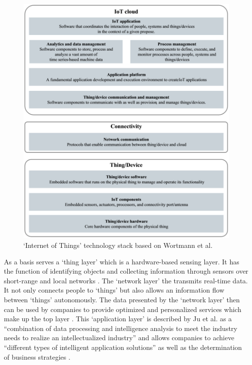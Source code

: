 	\begin{figure}[ht]
	    \begin{center}
	    \includegraphics[scale=0.66]{Talk11/wortmann_stack.png}
	    \end{center}
	    \caption{`Internet of Things' technology stack based on Wortmann et al. \cite{wortmann}}
	    \label{fig:wortmann_stack}
    \end{figure}
	
	As a basis serves a `thing layer' which is a hardware-based sensing layer. It has the function of identifying objects and collecting information through sensors over short-range and local networks \cite{ju}. The `network layer' the transmits real-time data. It not only connects people to `things' but also allows an information flow between `things' autonomously. The data presented by the `network layer' then can be used by companies to provide optimized and personalized services which make up the top layer \cite{ju}. This `application layer' is described by Ju et al. as a ``combination of data processing and intelligence analysis to meet the industry needs to realize an intellectualized industry'' \cite[p. 883]{ju} and allows companies to achieve ``different types of intelligent application solutions'' as well as the determination of business strategies \cite[p. 884]{ju}.

